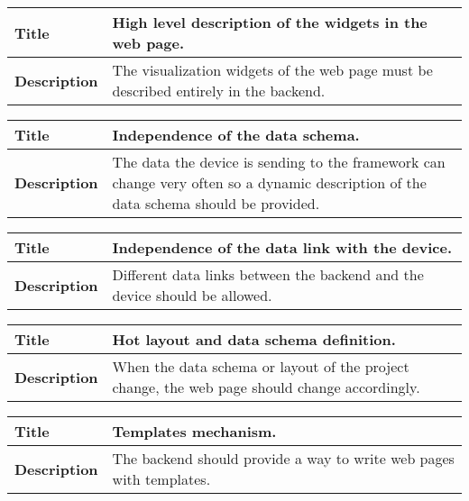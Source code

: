 \documentclass[12pt]{article}
\begin{document}
                \begin{tabularx}{\textwidth}{|l|X|}
                    \hline
                    \textbf{Title} & High level description of the widgets in
                    the web page. \\
                    \hline
                    \textbf{Description} & The visualization widgets of the web
                    page must be described entirely in the backend. \\
                    \hline
                \end{tabularx}

                \begin{tabularx}{\textwidth}{|l|X|}
                    \hline
                    \textbf{Title} & Independence of the data schema. \\
                    \hline
                    \textbf{Description} & The data the device is sending to the
                    framework can change very often so a dynamic description of
                    the data schema should be provided. \\
                    \hline
                \end{tabularx}

                \begin{tabularx}{\textwidth}{|l|X|}
                    \hline
                    \textbf{Title} & Independence of the data link with the
                    device. \\
                    \hline
                    \textbf{Description} & Different data links between the
                    backend and the device should be allowed. \\
                    \hline
                \end{tabularx}

                \begin{tabularx}{\textwidth}{|l|X|}
                    \hline
                    \textbf{Title} & Hot layout and data schema definition. \\
                    \hline
                    \textbf{Description} & When the data schema or layout of the
                    project change, the web page should change accordingly. \\
                    \hline
                \end{tabularx}

                \begin{tabularx}{\textwidth}{|l|X|}
                    \hline
                    \textbf{Title} & Templates mechanism. \\
                    \hline
                    \textbf{Description} & The backend should provide a way to
                    write web pages with templates. \\
                    \hline
                \end{tabularx}
\end{document}
